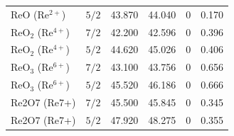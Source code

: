 \documentclass[12pt]{article}
\begin{document}
\begin{table}[H]
\begin{threeparttable}
\begin{tabular}{llrrrr}
$\mathrm{ReO}$ ($\mathrm{Re^{2+}}$) & $5/2$ & 43.870 & 44.040 & 0 & 0.170 \\
$\mathrm{ReO_2}$ ($\mathrm{Re^{4+}}$) & $7/2$ & 42.200 & 42.596 & 0 & 0.396 \\
$\mathrm{ReO_2}$ ($\mathrm{Re^{4+}}$) & $5/2$ & 44.620 & 45.026 & 0 & 0.406 \\
$\mathrm{ReO_3}$ ($\mathrm{Re^{6+}}$) & $7/2$ & 43.100 & 43.756 & 0 & 0.656 \\
$\mathrm{ReO_3}$ ($\mathrm{Re^{6+}}$) & $5/2$ & 45.520 & 46.186 & 0 & 0.666 \\
Re2O7 (Re7+) & $7/2$ & 45.500 & 45.845 & 0 & 0.345 \\
Re2O7 (Re7+) & $5/2$ & 47.920 & 48.275 & 0 & 0.355 \\
\bottomrule
\end{tabular}
\end{threeparttable}
\end{table}
\end{document}
